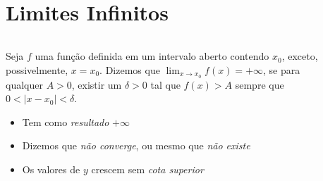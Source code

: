 \section{Limites Infinitos}

\begin{frame}
  \begin{columns}[onlytextwidth]
    \begin{column}{0.6\textwidth}\vspace{-0.5cm}
      \begin{definition}
        Seja $f$ uma função definida em um intervalo aberto contendo $x_{0}$, exceto, possivelmente, $x=x_{0}$. Dizemos que $\displaystyle\lim_{x\to x_{0}}f(x)=+\infty$, se para qualquer $A>0$, existir um $\delta>0$ tal que $f(x)>A$ sempre que $0 < |x-x_{0}| < \delta$.
      \end{definition}
      \begin{itemize}
        \item Tem como \emph{resultado} $+\infty$
        \item Dizemos que \emph{não converge}, ou mesmo que \emph{não existe}
        \item Os valores de $y$ crescem sem \emph{cota superior}
      \end{itemize}
    \end{column}
    \begin{column}{0.4\textwidth}\vspace{-0.5cm}
      \begin{figure}
      \end{figure}
    \end{column}
  \end{columns}
\end{frame}

